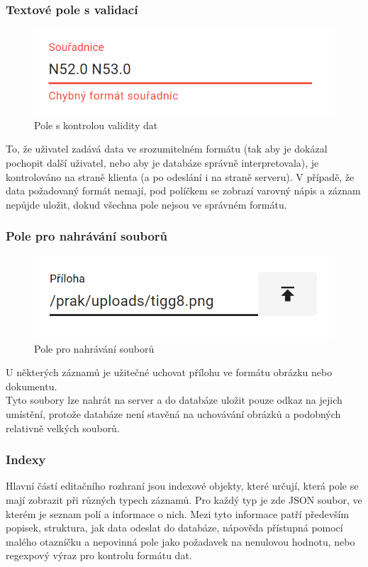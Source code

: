 \subsubsection{Textové pole s validací}
\begin{figure}
	\centering
	\includegraphics[width=\linewidth]{img/validationField.png}
	\caption{Pole s kontrolou validity dat}
\end{figure}
To, že uživatel zadává data ve srozumitelném formátu (tak aby je dokázal pochopit další
uživatel, nebo aby je databáze správně interpretovala), je kontrolováno na straně klienta
(a po odeslání i na straně serveru).
V případě, že data požadovaný formát nemají, pod políčkem se zobrazí varovný nápis a
záznam nepůjde uložit, dokud všechna pole nejsou ve správném formátu.

\subsubsection{Pole pro nahrávání souborů}
\begin{figure}
	\centering
	\includegraphics[width=\linewidth]{img/uploadField.png}
	\caption{Pole pro nahrávání souborů}
\end{figure}
U některých záznamů je užitečné uchovat přílohu ve formátu obrázku nebo dokumentu.\\
Tyto soubory lze nahrát na server a do databáze uložit pouze odkaz na jejich umístění,
protože databáze není stavěná na uchovávání obrázků a podobných relativně velkých souborů.

\subsubsection{Indexy}
Hlavní částí editačního rozhraní jsou indexové objekty, které určují, která pole
se mají zobrazit při různých typech záznamů. Pro každý typ je zde JSON soubor, ve kterém
je seznam polí a informace o nich. Mezi tyto informace patří především popisek, struktura, jak
data odeslat do databáze, nápověda přístupná pomocí malého otazníčku a nepovinná pole jako
požadavek na nenulovou hodnotu, nebo regexpový výraz pro kontrolu formátu dat.

